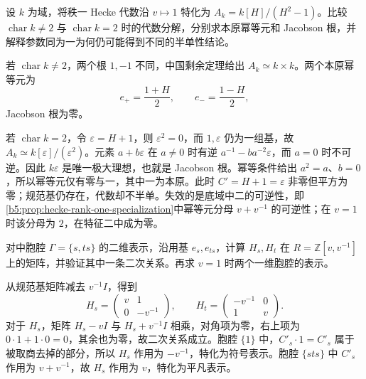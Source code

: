 \begin{exercise}\label{b5:ex:A-kl-simple-square}
	设 \(k\) 为域，将秩一 Hecke 代数沿 \(v\mapsto1\) 特化为 \(A_k=k[H]/(H^2-1)\)。比较 \(\operatorname{char}k\ne2\) 与 \(\operatorname{char}k=2\) 时的代数分解，分别求本原幂等元和 Jacobson 根，并解释参数同为一为何仍可能得到不同的半单性结论。
\end{exercise}
\begin{solution}
	若 \(\operatorname{char}k\ne2\)，两个根 \(1,-1\) 不同，中国剩余定理给出 \(A_k\simeq k\times k\)。两个本原幂等元为
	\[
		e_+=\frac{1+H}{2},\qquad e_-=\frac{1-H}{2},
	\]
	Jacobson 根为零。

	若 \(\operatorname{char}k=2\)，令 \(\varepsilon=H+1\)，则 \(\varepsilon^2=0\)，而 \(1,\varepsilon\) 仍为一组基，故 \(A_k\simeq k[\varepsilon]/(\varepsilon^2)\)。元素 \(a+b\varepsilon\) 在 \(a\ne0\) 时有逆 \(a^{-1}-ba^{-2}\varepsilon\)，而 \(a=0\) 时不可逆。因此 \(k\varepsilon\) 是唯一极大理想，也就是 Jacobson 根。幂等条件给出 \(a^2=a\)、\(b=0\)，所以幂等元仅有零与一，其中一为本原。此时 \(C'=H+1=\varepsilon\) 非零但平方为零；规范基仍存在，代数却不半单。失效的是底域中二的可逆性，即\cref{b5:prop:hecke-rank-one-specialization}中幂等元分母 \(v+v^{-1}\) 的可逆性；在 \(v=1\) 时该分母为 \(2\)，在特征二中成为零。
\end{solution}

\begin{exercise}\label{b5:ex:A-cell-specialization}
	对中胞腔 \(\Gamma=\{s,ts\}\) 的二维表示，沿用基 \(e_s,e_{ts}\)，计算 \(H_s,H_t\) 在 \(R=\mathbb Z[v,v^{-1}]\) 上的矩阵，并验证其中一条二次关系。再求 \(v=1\) 时两个一维胞腔的表示。
\end{exercise}
\begin{solution}
	从规范基矩阵减去 \(v^{-1}I\)，得到
	\[
		H_s=\begin{pmatrix}v&1\\0&-v^{-1}\end{pmatrix},
		\qquad H_t=\begin{pmatrix}-v^{-1}&0\\1&v\end{pmatrix}.
	\]
	对于 \(H_s\)，矩阵 \(H_s-vI\) 与 \(H_s+v^{-1}I\) 相乘，对角项为零，右上项为 \(0\cdot1+1\cdot0=0\)，其余也为零，故二次关系成立。胞腔 \(\{1\}\) 中，\(C'_s\cdot1=C'_s\) 属于被取商去掉的部分，所以 \(H_s\) 作用为 \(-v^{-1}\)，特化为符号表示。胞腔 \(\{sts\}\) 中 \(C'_s\) 作用为 \(v+v^{-1}\)，故 \(H_s\) 作用为 \(v\)，特化为平凡表示。
\end{solution}
